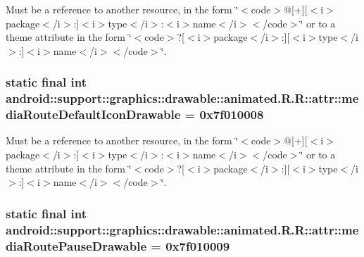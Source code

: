 Must be a reference to another resource, in the form \char`\"{}$<$code$>$@\mbox{[}+\mbox{]}\mbox{[}$<$i$>$package$<$/i$>$:\mbox{]}$<$i$>$type$<$/i$>$:$<$i$>$name$<$/i$>$$<$/code$>$\char`\"{} or to a theme attribute in the form \char`\"{}$<$code$>$?\mbox{[}$<$i$>$package$<$/i$>$:\mbox{]}\mbox{[}$<$i$>$type$<$/i$>$:\mbox{]}$<$i$>$name$<$/i$>$$<$/code$>$\char`\"{}. \hypertarget{classandroid_1_1support_1_1graphics_1_1drawable_1_1animated_1_1_r_1_1attr_1cd8807ab02590bcb43cf078d2be5c65}{
\subsubsection[{mediaRouteDefaultIconDrawable}]{\setlength{\rightskip}{0pt plus 5cm}static final int android::support::graphics::drawable::animated.R.R::attr::mediaRouteDefaultIconDrawable = 0x7f010008}}
\label{classandroid_1_1support_1_1graphics_1_1drawable_1_1animated_1_1_r_1_1attr_1cd8807ab02590bcb43cf078d2be5c65}


Must be a reference to another resource, in the form \char`\"{}$<$code$>$@\mbox{[}+\mbox{]}\mbox{[}$<$i$>$package$<$/i$>$:\mbox{]}$<$i$>$type$<$/i$>$:$<$i$>$name$<$/i$>$$<$/code$>$\char`\"{} or to a theme attribute in the form \char`\"{}$<$code$>$?\mbox{[}$<$i$>$package$<$/i$>$:\mbox{]}\mbox{[}$<$i$>$type$<$/i$>$:\mbox{]}$<$i$>$name$<$/i$>$$<$/code$>$\char`\"{}. \hypertarget{classandroid_1_1support_1_1graphics_1_1drawable_1_1animated_1_1_r_1_1attr_59b113e1a292cf9931e6659fdedcf99c}{
\subsubsection[{mediaRoutePauseDrawable}]{\setlength{\rightskip}{0pt plus 5cm}static final int android::support::graphics::drawable::animated.R.R::attr::mediaRoutePauseDrawable = 0x7f010009}}
\label{classandroid_1_1support_1_1graphics_1_1drawable_1_1animated_1_1_r_1_1attr_59b113e1a292cf9931e6659fdedcf99c}



